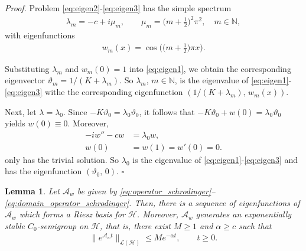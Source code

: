 \documentclass[letterpaper, 10 pt, conference]{ieeeconf}  %
\newtheorem{lemma}{Lemma}%
\newenvironment{pf}
{\noindent\textit{Proof.}\hspace{1.2mm}}
{\hspace{\fill}$\square$}
\begin{document}
\begin{pf}
Problem \eqref{eq:eigen2}-\eqref{eq:eigen3} has the simple spectrum
\begin{align*}
    \lambda_m=-c+i\mu_m,\qquad \mu_m=\Big(m+\tfrac12\Big)^2\pi^2,\quad m\in\mathbb{N},
\end{align*}
\noindent with eigenfunctions
\begin{align*}
   w_m(x)=\cos\!\Big(\big(m+\tfrac12\big)\pi x\Big).
\end{align*}

Substituting $\lambda_m$ and $w_m(0)=1$ into \eqref{eq:eigen1}, we obtain the corresponding eigenvector $\vartheta_m = 1/(K+\lambda_m)$. So $\lambda_m$, $m\in\mathbb{N}$, is the eigenvalue of \eqref{eq:eigen1}-\eqref{eq:eigen3} withe the corresponding eigenfunction $(1/(K+\lambda_m),\, w_m (x))$.

Next, let $\lambda = \lambda_0$. Since $-K\vartheta_{0}=\lambda_0 \vartheta_0$, it follows that $-K\vartheta_{0}+w(0)=\lambda_0 \vartheta_0$ yields $w(0)\equiv 0$. Moreover,
\begin{align*}
    -iw''-cw &= \lambda_0 w,\\
    w(0)&=w(1)= w'(0)=0.
\end{align*}
\noindent only has the trivial solution. So $\lambda_0$ is the eigenvalue of \eqref{eq:eigen1}-\eqref{eq:eigen3} and has the eigenfunction $(\vartheta_0 , \, 0)$. 
\end{pf}

\medskip

\begin{lemma}\label{prop:gen-stab}
Let $\mathcal A_w$ be given by \eqref{eq:operator_schrodinger}--\eqref{eq:domain_operator_schrodinger}. Then, there is a sequence of eigenfunctions of $\mathcal A_w$ which forms a Riesz basis for $\mathcal{H}$. Moreover,  $\mathcal A_w$ generates an exponentially stable $C_0$-semigroup on $\mathcal H$, that is, there exist $M\ge1$ and $\alpha\ge c$ such that
\begin{align*}
    \|e^{\mathcal A_w t}\|_{\mathcal L(\mathcal H)} \le M e^{-\alpha t},\qquad t\ge0.
\end{align*}
\end{lemma}

\medskip
\end{document}
